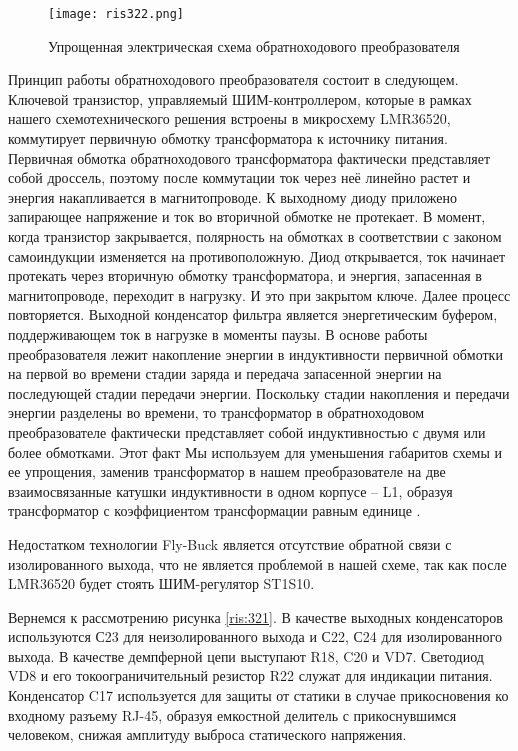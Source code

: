 \begin{figure}[H]
    \centering
    \texttt{[image: ris322.png]}
    \caption{Упрощенная электрическая схема обратноходового преобразователя}
    \label{ris:322}
\end{figure}

Принцип работы обратноходового преобразователя состоит в следующем. Ключевой транзистор, 
управляемый ШИМ-контроллером, которые в рамках нашего схемотехнического решения встроены
в микросхему LMR36520, коммутирует первичную обмотку трансформатора к источнику питания.
Первичная обмотка обратноходового трансформатора фактически представляет собой дроссель, 
поэтому после коммутации ток через неё линейно растет и энергия накапливается в магнитопроводе. 
К выходному диоду приложено запирающее напряжение и ток во вторичной обмотке не протекает. 
В момент, когда транзистор закрывается, полярность на обмотках в соответствии с законом 
самоиндукции изменяется на противоположную. Диод открывается, ток начинает протекать через
вторичную обмотку трансформатора, и энергия, запасенная в магнитопроводе, переходит в нагрузку. 
И это при закрытом ключе. Далее процесс повторяется. Выходной конденсатор фильтра является 
энергетическим буфером, поддерживающем ток в нагрузке в моменты паузы.
В основе работы преобразователя лежит накопление энергии в индуктивности первичной обмотки 
на первой во времени стадии заряда и передача запасенной энергии на последующей стадии 
передачи энергии. Поскольку стадии накопления и передачи энергии разделены во времени, 
то трансформатор в обратноходовом преобразователе фактически представляет собой индуктивностью 
с двумя или более обмотками. Этот факт Мы используем для уменьшения габаритов схемы и ее упрощения,
заменив трансформатор в нашем преобразователе на две взаимосвязанные катушки индуктивности в 
одном корпусе -- L1, образуя трансформатор с коэффициентом трансформации равным единице
\cite{PowerElectronic:FlyBack} 
\cite{Würth Elektronik:Application Note}
\cite{DC-DC_Book:Recom}.

Недостатком технологии Fly-Buck является отсутствие обратной связи с изолированного выхода, что 
не является проблемой в нашей схеме, так как после LMR36520 будет стоять ШИМ-регулятор ST1S10.

Вернемся к рассмотрению рисунка \ref{ris:321}. В качестве выходных конденсаторов используются
С23 для неизолированного выхода и С22, С24 для изолированного выхода. В качестве демпферной цепи 
выступают R18, C20 и VD7. Светодиод VD8 и его токоограничительный резистор R22 служат для 
индикации питания. Конденсатор C17 используется для защиты от статики в случае прикосновения ко 
входному разъему RJ-45, образуя емкостной делитель с прикоснувшимся человеком, снижая амплитуду 
выброса статического напряжения. 

